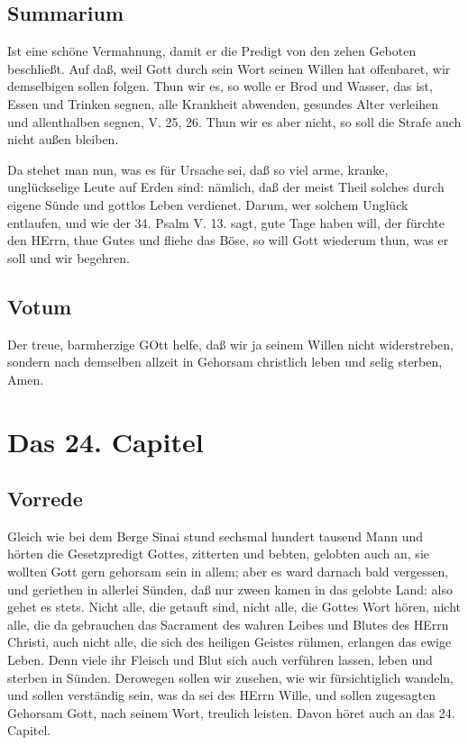 \section{Summarium}

Ist eine schöne Vermahnung, damit er die Predigt von den zehen Geboten beschließt. Auf daß, weil Gott durch sein Wort seinen Willen hat offenbaret, wir demselbigen sollen folgen. Thun wir es, so wolle er Brod und Wasser, das ist, Essen und Trinken segnen, alle Krankheit abwenden, gesundes Alter verleihen und allenthalben segnen, V. 25, 26. Thun wir es aber nicht, so soll die Strafe auch nicht außen bleiben.

Da stehet man nun, was es für Ursache sei, daß so viel arme, kranke, unglückselige Leute auf Erden sind: nämlich, daß der meist Theil solches durch eigene Sünde und gottlos Leben verdienet. Darum, wer solchem Unglück entlaufen, und wie der 34. Psalm V. 13. sagt, gute Tage haben will, der fürchte den HErrn, thue Gutes und fliehe das Böse, so will Gott wiederum thun, was er soll und wir begehren.

\section{Votum}

Der treue, barmherzige GOtt helfe, daß wir ja seinem Willen nicht widerstreben, sondern nach demselben allzeit in Gehorsam christlich leben und selig sterben, Amen.

\chapter{Das 24. Capitel}

\section{Vorrede}

Gleich wie bei dem Berge Sinai stund sechsmal hundert tausend Mann und hörten die Gesetzpredigt Gottes, zitterten und bebten, gelobten auch an, sie wollten Gott gern gehorsam sein in allem; aber es ward darnach bald vergessen, und geriethen in allerlei Sünden, daß nur zween kamen in das gelobte Land: also gehet es stets. Nicht alle, die getauft sind, nicht alle, die Gottes Wort hören, nicht alle, die da gebrauchen das Sacrament des wahren Leibes und Blutes des HErrn Christi, auch nicht alle, die sich des heiligen Geistes rühmen, erlangen das ewige Leben. Denn viele ihr Fleisch und Blut sich auch verführen lassen, leben und sterben in Sünden. Derowegen sollen wir zusehen, wie wir fürsichtiglich wandeln, und sollen verständig sein, was da sei des HErrn Wille, und sollen zugesagten Gehorsam Gott, nach seinem Wort, treulich leisten. Davon höret auch an das 24. Capitel.

